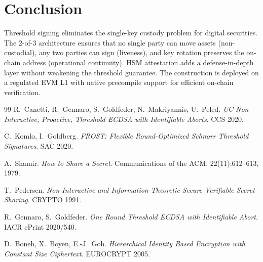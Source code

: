 \section{Conclusion}

\label{sec:conclusion}

Threshold signing eliminates the single-key custody problem for digital
securities.  The 2-of-3 architecture ensures that no single party can
move assets (non-custodial), any two parties can sign (liveness), and
key rotation preserves the on-chain address (operational continuity).
HSM attestation adds a defense-in-depth layer without weakening the
threshold guarantee.  The construction is deployed on a regulated EVM L1
with native precompile support for efficient on-chain verification.

\begin{thebibliography}{99}
R.~Canetti, R.~Gennaro, S.~Goldfeder, N.~Makriyannis, U.~Peled.
\emph{UC Non-Interactive, Proactive, Threshold ECDSA with Identifiable
Aborts}.
CCS 2020.

C.~Komlo, I.~Goldberg.
\emph{FROST: Flexible Round-Optimized Schnorr Threshold Signatures}.
SAC 2020.

A.~Shamir.
\emph{How to Share a Secret}.
Communications of the ACM, 22(11):612--613, 1979.

T.~Pedersen.
\emph{Non-Interactive and Information-Theoretic Secure Verifiable
Secret Sharing}.
CRYPTO 1991.

R.~Gennaro, S.~Goldfeder.
\emph{One Round Threshold ECDSA with Identifiable Abort}.
IACR ePrint 2020/540.

D.~Boneh, X.~Boyen, E.-J.~Goh.
\emph{Hierarchical Identity Based Encryption with Constant Size
Ciphertext}.
EUROCRYPT 2005.
\end{thebibliography}


